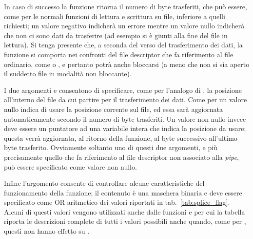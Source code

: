 In caso di successo la funzione ritorna il numero di byte trasferiti, che può
essere, come per le normali funzioni di lettura e scrittura su file, inferiore
a quelli richiesti; un valore negativo indicherà un errore mentre un valore
nullo indicherà che non ci sono dati da trasferire (ad esempio si è giunti
alla fine del file in lettura). Si tenga presente che, a seconda del verso del
trasferimento dei dati, la funzione si comporta nei confronti del file
descriptor che fa riferimento al file ordinario, come  o
, e pertanto potrà anche bloccarsi (a meno che non si sia aperto
il suddetto file in modalità non bloccante).

I due argomenti  e  consentono di specificare,
come per l'analogo  di , la posizione all'interno
del file da cui partire per il trasferimento dei dati. Come per
 un valore nullo indica di usare la posizione corrente sul
file, ed essa sarà aggiornata automaticamente secondo il numero di byte
trasferiti. Un valore non nullo invece deve essere un puntatore ad una
variabile intera che indica la posizione da usare; questa verrà aggiornata, al
ritorno della funzione, al byte successivo all'ultimo byte trasferito.
Ovviamente soltanto uno di questi due argomenti, e più precisamente quello che
fa riferimento al file descriptor non associato alla \textit{pipe}, può essere
specificato come valore non nullo.

Infine l'argomento  consente di controllare alcune
caratteristiche del funzionamento della funzione; il contenuto è una maschera
binaria e deve essere specificato come OR aritmetico dei valori riportati in
tab.~\ref{tab:splice_flag}. Alcuni di questi valori vengono utilizzati anche
dalle funzioni  e  per cui la tabella riporta le
descrizioni complete di tutti i valori possibili anche quando, come per
, questi non hanno effetto su .

